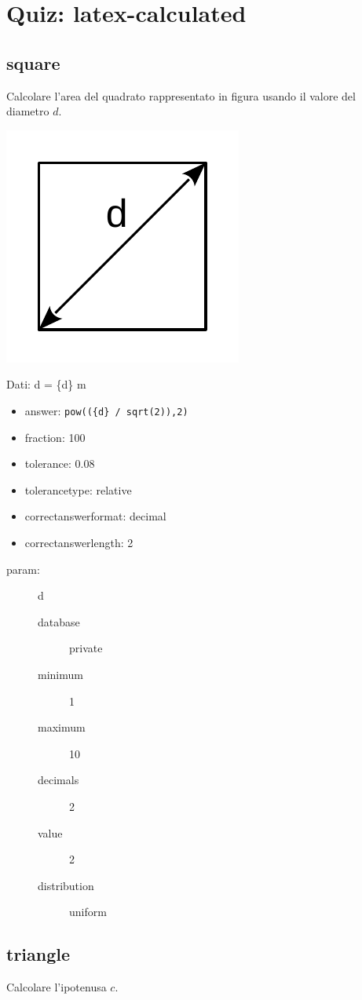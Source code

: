 \documentclass{article}
\begin{document}
	

\section{Quiz: latex-calculated}

\subsection{square}
Calcolare l'area del quadrato rappresentato in figura usando il valore del diametro $d$.

\includegraphics[width=0.3\columnwidth]{./img/square}

Dati: d = \{d\} m

\begin{itemize}
	\item answer: \texttt{pow((\{d\} / sqrt(2)),2)}
	\item fraction: 100
	\item tolerance: 0.08
	\item tolerancetype: relative %
	\item correctanswerformat: decimal %
	\item correctanswerlength: 2
\end{itemize}

\begin{description}
	\item[param:] d
	\begin{description}
		\item[database] private  %
		\item[minimum] 1
		\item[maximum] 10
		\item[decimals] 2
		\item[value] 2
		\item[distribution] uniform   %
	\end{description}
\end{description}


\subsection{triangle}
Calcolare l'ipotenusa $c$.
\end{document}

